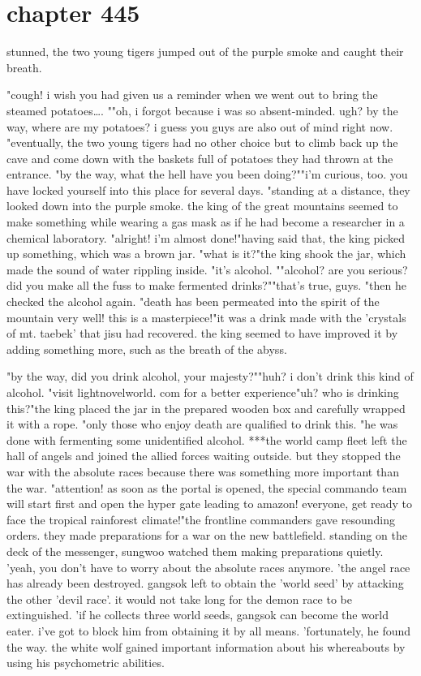 \section{chapter 445}

stunned, the two young tigers jumped out of the purple smoke and caught their breath.





"cough! i wish you had given us a reminder when we went out to bring the steamed potatoes….
""oh, i forgot because i was so absent-minded.
 ugh? by the way, where are my potatoes? i guess you guys are also out of mind right now.
"eventually, the two young tigers had no other choice but to climb back up the cave and come down with the baskets full of potatoes they had thrown at the entrance.
"by the way, what the hell have you been doing?""i'm curious, too.
 you have locked yourself into this place for several days.
"standing at a distance, they looked down into the purple smoke.
the king of the great mountains seemed to make something while wearing a gas mask as if he had become a researcher in a chemical laboratory.
"alright! i'm almost done!"having said that, the king picked up something, which was a brown jar.
"what is it?"the king shook the jar, which made the sound of water rippling inside.
 "it's alcohol.
""alcohol? are you serious? did you make all the fuss to make fermented drinks?""that's true, guys.
"then he checked the alcohol again.
"death has been permeated into the spirit of the mountain very well! this is a masterpiece!"it was a drink made with the 'crystals of mt.
 taebek' that jisu had recovered.
 the king seemed to have improved it by adding something more, such as the breath of the abyss.

"by the way, did you drink alcohol, your majesty?""huh? i don't drink this kind of alcohol.
"visit lightnovelworld.
c­om for a better experience"uh? who is drinking this?"the king placed the jar in the prepared wooden box and carefully wrapped it with a rope.
 "only those who enjoy death are qualified to drink this.
"he was done with fermenting some unidentified alcohol.
***the world camp fleet left the hall of angels and joined the allied forces waiting outside.
but they stopped the war with the absolute races because there was something more important than the war.
 "attention! as soon as the portal is opened, the special commando team will start first and open the hyper gate leading to amazon! everyone, get ready to face the tropical rainforest climate!"the frontline commanders gave resounding orders.
 they made preparations for a war on the new battlefield.
standing on the deck of the messenger, sungwoo watched them making preparations quietly.
 'yeah, you don't have to worry about the absolute races anymore.
'the angel race has already been destroyed.
 gangsok left to obtain the 'world seed' by attacking the other 'devil race'.
 it would not take long for the demon race to be extinguished.
'if he collects three world seeds, gangsok can become the world eater.
 i've got to block him from obtaining it by all means.
'fortunately, he found the way.
 the white wolf gained important information about his whereabouts by using his psychometric abilities.

